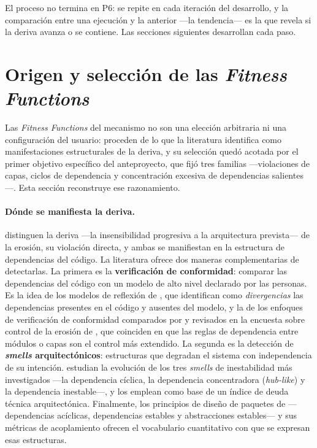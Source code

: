 El proceso no termina en P6: se repite en cada iteración del desarrollo, y la comparación entre una ejecución y la anterior ---la tendencia--- es la que revela si la deriva avanza o se contiene. Las secciones siguientes desarrollan cada paso.

\section{Origen y selección de las \textit{Fitness Functions}}
\label{sec:seleccion}
Las \textit{Fitness Functions} del mecanismo no son una elección arbitraria ni una configuración del usuario: proceden de lo que la literatura identifica como manifestaciones estructurales de la deriva, y su selección quedó acotada por el primer objetivo específico del anteproyecto, que fijó tres familias ---violaciones de capas, ciclos de dependencia y concentración excesiva de dependencias salientes---. Esta sección reconstruye ese razonamiento.

\paragraph{Dónde se manifiesta la deriva.} \citet{PerryWolf1992} distinguen la deriva ---la insensibilidad progresiva a la arquitectura prevista--- de la erosión, su violación directa, y ambas se manifiestan en la estructura de dependencias del código. La literatura ofrece dos maneras complementarias de detectarlas. La primera es la \textbf{verificación de conformidad}: comparar las dependencias del código con un modelo de alto nivel declarado por las personas. Es la idea de los modelos de reflexión de \citet{Murphy2001}, que identifican como \textit{divergencias} las dependencias presentes en el código y ausentes del modelo, y la de los enfoques de verificación de conformidad comparados por \citet{KnodelPopescu2007} y revisados en la encuesta sobre control de la erosión de \citet{DeSilva2012}, que coinciden en que las reglas de dependencia entre módulos o capas son el control más extendido. La segunda es la detección de \textbf{\textit{smells} arquitectónicos}: estructuras que degradan el sistema con independencia de su intención. \citet{Sas2019} estudian la evolución de los tres \textit{smells} de inestabilidad más investigados ---la dependencia cíclica, la dependencia concentradora (\textit{hub-like}) y la dependencia inestable---, y \citet{SasAvgeriou} los emplean como base de un índice de deuda técnica arquitectónica. Finalmente, los principios de diseño de paquetes de \citet{Martin2003} ---dependencias acíclicas, dependencias estables y abstracciones estables--- y sus métricas de acoplamiento ofrecen el vocabulario cuantitativo con que se expresan esas estructuras.

